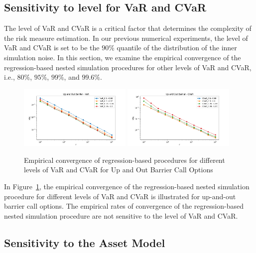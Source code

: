 \subsection{Sensitivity to level for VaR and CVaR} \label{sec1:sensitivity-level}

The level of VaR and CVaR is a critical factor that determines the complexity of the risk measure estimation.
In our previous numerical experiments, the level of VaR and CVaR is set to be the $90\%$ quantile of the distribution of the inner simulation noise.
In this section, we examine the empirical convergence of the regression-based nested simulation procedures for other levels of VaR and CVaR, i.e., $80\%$, $95\%$, $99\%$, and $99.6\%$.

\begin{figure}[ht!] 
    \centering
    \includegraphics[width=0.48\textwidth]{./project1/figures/figure9a.png}
    \includegraphics[width=0.48\textwidth]{./project1/figures/figure9b.png}
    \caption{Empirical convergence of regression-based procedures for different levels of VaR and CVaR for Up and Out Barrier Call Options}
    \label{fig1:sens_level}
\end{figure}

In Figure~\ref{fig1:sens_level}, the empirical convergence of the regression-based nested simulation procedure for different levels of VaR and CVaR is illustrated for up-and-out barrier call options.
The empirical rates of convergence of the regression-based nested simulation procedure are not sensitive to the level of VaR and CVaR.

\subsection{Sensitivity to the Asset Model} \label{sec1:sensitivity-assetModel}

